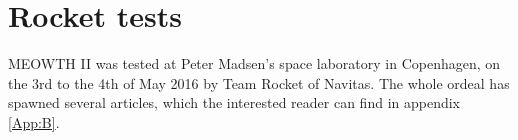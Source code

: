 \chapter{Rocket tests}

	MEOWTH II was tested at Peter Madsen's space laboratory in Copenhagen, on the 3rd to the 4th of May 2016 by Team Rocket of Navitas. The whole ordeal has spawned several articles, which the interested reader can find in appendix \ref{App:B}.


%
%
%
%
%
%
%
